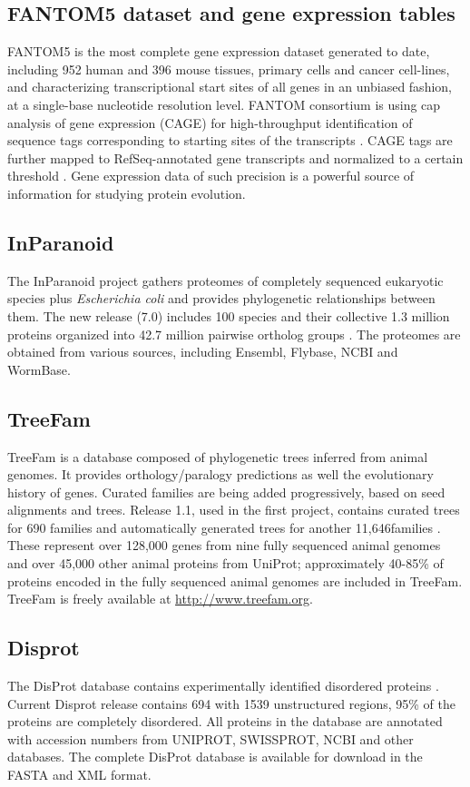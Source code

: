 \documentclass[11pt, a4paper,oneside]{report}
\begin{document}
\subsection{FANTOM5 dataset and gene expression tables}
FANTOM5 is the most complete gene expression dataset generated to date, including 952 human and 396 mouse tissues, primary cells and cancer cell-lines, and characterizing transcriptional start sites of all genes in an unbiased fashion, at a single-base nucleotide resolution level. FANTOM consortium is using cap analysis of gene expression (CAGE) for high-throughput identification of sequence tags corresponding to starting sites of the transcripts \cite{Shiraki2003}. CAGE tags are further mapped to RefSeq-annotated gene transcripts and normalized to a certain threshold \cite{Balwierz2009}. Gene expression data of such precision is a powerful source of information for studying protein evolution. 

\subsection{InParanoid}
The InParanoid project gathers proteomes of completely sequenced eukaryotic species plus \emph{Escherichia coli} and provides phylogenetic relationships between them. The new release (7.0) includes 100 species and their collective 1.3 million proteins organized into 42.7 million pairwise ortholog groups \cite{Ostlund2010}. The proteomes are obtained from various sources, including Ensembl, Flybase, NCBI and WormBase. 
\subsection{TreeFam}
TreeFam is a database composed of phylogenetic trees inferred from animal genomes. It provides orthology/paralogy predictions as well the evolutionary history of genes. Curated families are being added progressively, based on seed alignments and trees. Release 1.1, used in the first project, contains curated trees for 690 families and automatically generated trees for another 11,646families \cite{Li2006}. These represent over 128,000 genes from nine fully sequenced animal genomes and over 45,000 other animal proteins from UniProt; approximately 40-85\% of proteins encoded in the fully sequenced animal genomes are included in TreeFam. TreeFam is freely available at \url{http://www.treefam.org}.
\subsection{Disprot}
The DisProt database contains experimentally identified disordered proteins \cite{Sickmeier2007}. Current Disprot release contains 694 with 1539 unstructured regions, 95\% of the proteins are completely disordered. All proteins in the database are annotated with accession numbers from UNIPROT, SWISSPROT, NCBI and other databases. The complete DisProt database is available for download in the FASTA and XML format.
\end{document}
